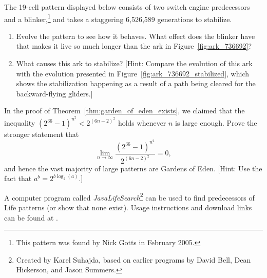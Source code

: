 \begin{multicols}{2}
\mfilbreak


\begin{problemstar}\label{exer:ark}
	The 19-cell pattern displayed below consists of two switch engine predecessors and a blinker,\footnote{This pattern was found by Nick Gotts in February 2005.} and takes a staggering 6,526,589 generations to stabilize.
	
	\begin{center}
	\end{center}
	
	\begin{enumerate}[label=\bf\color{ocre}(\alph*)]
		\item Evolve the pattern to see how it behaves. What effect does the blinker have that makes it live so much longer than the ark in Figure~\ref{fig:ark_736692}?
		
		\item What causes this ark to stabilize? [Hint: Compare the evolution of this ark with the evolution presented in Figure~\ref{fig:ark_736692_stabilized}, which shows the stabilization happening as a result of a path being cleared for the backward-flying gliders.]
	\end{enumerate}
\end{problemstar}


\mfilbreak


\begin{problem}\label{exer:goe_theorem_limit}
	In the proof of Theorem~\ref{thm:garden_of_eden_exists}, we claimed that the inequality $(2^{36}-1)^{n^2} < 2^{(6n-2)^2}$ holds whenever $n$ is large enough. Prove the stronger statement that
	\[
		\lim_{n\rightarrow\infty}\frac{(2^{36}-1)^{n^2}}{2^{(6n-2)^2}} = 0,
	\]
	and hence the vast majority of large patterns are Gardens of Eden. [Hint: Use the fact that $a^b = 2^{b\log_2(a)}$.]
\end{problem}


\mfilbreak


\begin{problem}\label{exer:goe_jls}
A computer program called \emph{JavaLifeSearch}\footnote{Created by Karel Suhajda, based on earlier programs by David Bell, Dean Hickerson, and Jason Summers.} can be used to find predecessors of Life patterns (or show that none exist). Usage instructions and download links can be found at .\smallskip


\end{problem}
\end{multicols}
